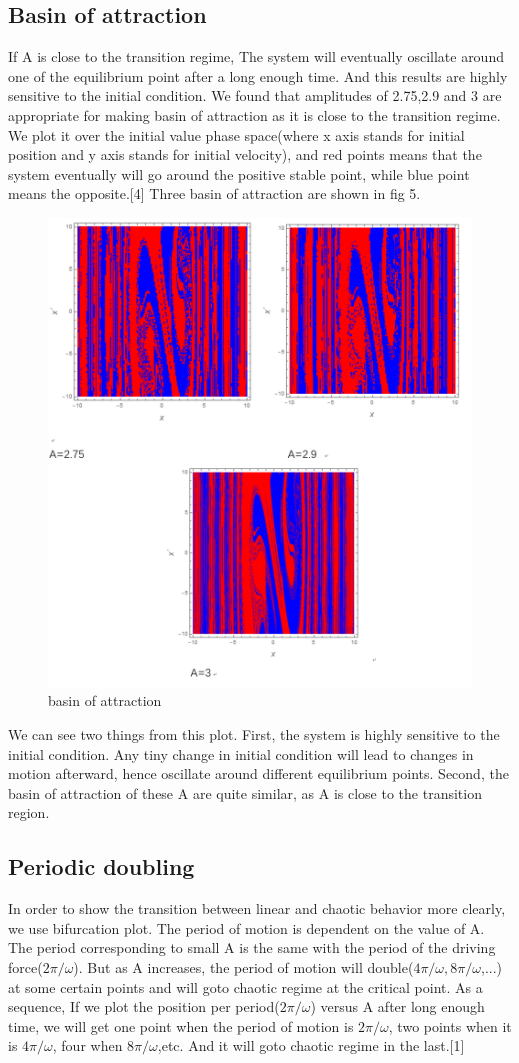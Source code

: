 \documentclass{article}
\begin{document}
\subsection{\textbf{Basin of attraction}}
If A is close to the transition regime, The system will eventually oscillate around one of the equilibrium point after a long enough time. And this results are highly sensitive to the initial condition. We found that amplitudes of 2.75,2.9 and 3 are appropriate for making basin of attraction as it is close to the transition regime. We plot it over the initial value phase space(where x axis stands for initial position and y axis stands for initial velocity), and red points means that the system eventually will go around the positive stable point, while blue point means the opposite.[4] Three basin of attraction are shown in fig 5.

\begin{figure}[h]
	\centering
	\includegraphics[width=0.5\linewidth]{plot/basin_2}
	\caption{basin of attraction}
	\label{fig:basin}
\end{figure}

We can see two things from this plot. First, the system is highly sensitive to the initial condition. Any tiny change in initial condition will lead to changes in motion afterward, hence oscillate around different equilibrium points. Second, the basin of attraction of these A are quite similar, as A is close to the transition region.

\subsection{\textbf{Periodic doubling}}
In order to show the transition between linear and chaotic behavior more clearly, we use bifurcation plot. The period of motion is dependent on the value of A. The period corresponding to small A is the same with the period of the driving force($2\pi/\omega$). But as A increases, the period of motion will double($4\pi/\omega,8\pi/\omega$,...) at some certain points and will goto chaotic regime at the critical point. As a sequence, If we plot the position per period($2\pi/\omega$) versus A after long enough time, we will get one point when the period of motion is $2\pi/\omega$, two points when it is $4\pi/\omega$, four when $8\pi/\omega$,etc. And it will goto chaotic regime in the last.[1]
\end{document}
